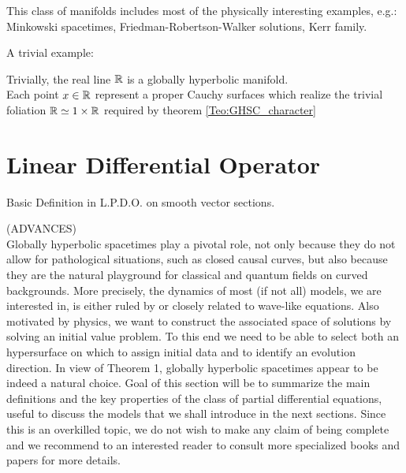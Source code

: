 \documentclass[a4paper,12pt]{scrartcl}    %
\begin{document}
		This class of manifolds includes most of the physically interesting examples, e.g.: Minkowski spacetimes, Friedman-Robertson-Walker solutions, Kerr family. \cite{advances}
					
			A trivial example:		
			\begin{example}
				Trivially, the real line $\mathbb{R}$ is a globally hyperbolic manifold.
				\\
				Each point $x\in \mathbb{R}$ represent a proper Cauchy surfaces which realize the trivial foliation $\mathbb{R} \simeq 1\times \mathbb{R} $ required by theorem \ref{Teo:GHSC_character}
			\end{example}
		

\newpage
\section{Linear Differential Operator}
Basic Definition in L.P.D.O. on smooth vector sections.
\\
		\begin{Warning}
		(ADVANCES)\\
		Globally hyperbolic spacetimes play a pivotal role, not only because they do not allow for pathological situations, such as closed causal curves, but also because they are the natural playground for classical and quantum fields on curved backgrounds. 
		More precisely, the dynamics of most (if not all) models, we are interested in, is either ruled by or closely related to wave-like equations. Also motivated by physics, we want to construct the associated space of solutions by solving an initial value problem. 
		To this end we need to be able to select both an hypersurface on which to assign initial data and to identify an evolution direction. In view of Theorem 1, globally hyperbolic spacetimes appear to be indeed a natural choice. 
		Goal of this section will be to summarize the main definitions and the key properties of the class of partial differential equations, useful to discuss the models that we shall introduce in the next sections. 
		Since this is an overkilled topic, we do not wish to make any claim of being complete and we recommend to an interested reader to consult more specialized books and papers for more details.
		\end{Warning}
\end{document}

